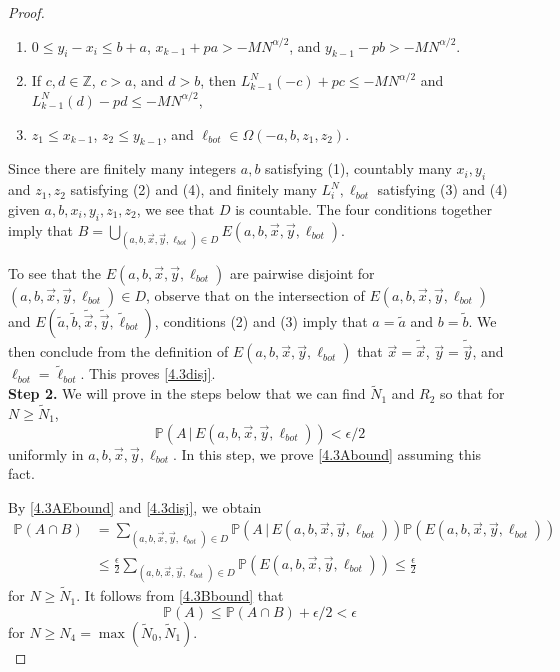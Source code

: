 \begin{proof}
\begin{enumerate}[label=(\arabic*)]
			\item $0 \leq y_i - x_i \leq b+a$, $x_{k-1} + pa > - MN^{\alpha/2}$, and $y_{k-1} - pb > - MN^{\alpha/2}$.
			
			\item If $c,d\in\mathbb{Z}$, $c > a$, and $d > b$, then $L_{k-1}^N(-c) + pc \leq -MN^{\alpha/2}$ and $L_{k-1}^N(d) - pd \leq -MN^{\alpha/2}$,
			
			\item $z_1\leq x_{k-1}$, $z_2\leq y_{k-1}$, and $\ell_{bot}\in\Omega(-a,b,z_1,z_2)$.
			
		\end{enumerate} 
		Since there are finitely many integers $a,b$ satisfying (1), countably many $x_i,y_i$ and $z_1,z_2$ satisfying (2) and (4), and finitely many $L_i^N,\ell_{bot}$ satisfying (3) and (4) given $a,b,x_i,y_i,z_1,z_2$, we see that $D$ is countable. The four conditions together imply that $B = \bigcup_{(a,b,\vec{x},\vec{y},\ell_{bot})\in D} E(a,b,\vec{x},\vec{y},\ell_{bot})$.
		
		To see that the $E(a,b,\vec{x},\vec{y},\ell_{bot})$ are pairwise disjoint for $(a,b,\vec{x},\vec{y},\ell_{bot})\in D$, observe that on the intersection of $E(a,b,\vec{x},\vec{y},\ell_{bot})$ and $E(\tilde a,\tilde b,\tilde{\vec{x}},\tilde{\vec{y}},\tilde{\ell}_{bot})$, conditions (2) and (3) imply that $a=\tilde{a}$ and $b=\tilde{b}$. We then conclude from the definition of $E(a,b,\vec{x},\vec{y},\ell_{bot})$ that $\vec{x}=\tilde{\vec{x}}$, $\vec{y} = \tilde{\vec{y}}$, and $\ell_{bot} = \tilde{\ell}_{bot}$. This proves \eqref{4.3disj}.\\
		
		\noindent\textbf{Step 2.} We will prove in the steps below that we can find $\tilde{N}_1$ and $R_2$ so that for $N\geq\tilde{N}_1$,
		\begin{equation}\label{4.3AEbound}
		\mathbb{P}(A\,|\,E(a,b,\vec{x},\vec{y},\ell_{bot})) < \epsilon/2
		\end{equation}
		uniformly in $a,b,\vec{x},\vec{y},\ell_{bot}$. In this step, we prove \eqref{4.3Abound} assuming this fact.
		
		By \eqref{4.3AEbound} and \eqref{4.3disj}, we obtain
		\begin{align*}
		\mathbb{P}(A \cap B) &= \sum_{(a,b,\vec{x},\vec{y},\ell_{bot})\in D} \mathbb{P}(A\,|\,E(a,b,\vec{x},\vec{y},\ell_{bot}))\mathbb{P}(E(a,b,\vec{x},\vec{y},\ell_{bot}))\\
		&\leq \frac{\epsilon}{2}\sum_{(a,b,\vec{x},\vec{y},\ell_{bot})\in D} \mathbb{P}(E(a,b,\vec{x},\vec{y},\ell_{bot})) \leq \frac{\epsilon}{2}
		\end{align*}
		for $N\geq\tilde{N}_1$. It follows from \eqref{4.3Bbound} that
		\begin{equation*}
		\mathbb{P}(A) \leq \mathbb{P}(A\cap B) + \epsilon/2 < \epsilon
		\end{equation*}
		for $N\geq N_4 = \max(\tilde{N}_0,\tilde{N}_1)$.\\
		

\end{proof}
